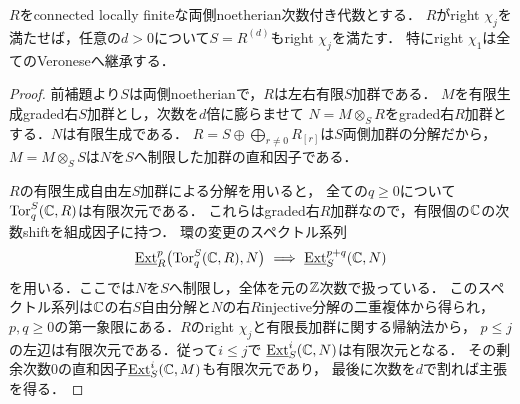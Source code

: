 \documentclass[11pt,a4paper]{ltjsarticle}
\begin{document}
\begin{lemma}\label{lem:v8-chi-veronese}
$R$をconnected locally finiteな両側noetherian次数付き代数とする．
$R$がright $\chi_j$を満たせば，任意の$d>0$について$S=R^{(d)}$もright $\chi_j$を満たす．
特にright $\chi_1$は全てのVeroneseへ継承する．
\end{lemma}
\begin{proof}
前補題より$S$は両側noetherianで，$R$は左右有限$S$加群である．
$M$を有限生成graded右$S$加群とし，次数を$d$倍に膨らませて
$N=M\otimes_S R$をgraded右$R$加群とする．$N$は有限生成である．
$R=S\oplus\bigoplus_{r\ne0}R_{[r]}$は$S$両側加群の分解だから，
$M=M\otimes_SS$は$N$を$S$へ制限した加群の直和因子である．

$R$の有限生成自由左$S$加群による分解を用いると，
全ての$q\ge0$について$\operatorname{Tor}_q^S(\mathbb C,R)$は有限次元である．
これらはgraded右$R$加群なので，有限個の$\mathbb C$の次数shiftを組成因子に持つ．
環の変更のスペクトル系列
\[
 \underline{\operatorname{Ext}}_R^p\bigl(\operatorname{Tor}_q^S(\mathbb C,R),N\bigr)
 \ \Longrightarrow\
 \underline{\operatorname{Ext}}_S^{p+q}(\mathbb C,N)
\]
を用いる．ここでは$N$を$S$へ制限し，全体を元の$\mathbb Z$次数で扱っている．
このスペクトル系列は$\mathbb C$の右$S$自由分解と$N$の右$R$injective分解の二重複体から得られ，
$p,q\ge0$の第一象限にある．$R$のright $\chi_j$と有限長加群に関する帰納法から，
$p\le j$の左辺は有限次元である．従って$i\le j$で
$\underline{\operatorname{Ext}}_S^i(\mathbb C,N)$は有限次元となる．
その剰余次数$0$の直和因子$\underline{\operatorname{Ext}}_S^i(\mathbb C,M)$も有限次元であり，
最後に次数を$d$で割れば主張を得る．
\end{proof}
\end{document}
